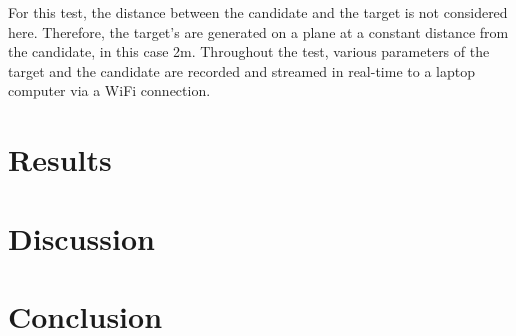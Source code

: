 \documentclass[format=sigconf, review=true, screen=true, anonymous=true]{acmart}
\begin{document}
For this test, the distance between the candidate and the target is not considered here. Therefore, the target's are generated on a plane at a constant distance from the candidate, in this case 2m. Throughout the test, various parameters of the target and the candidate are recorded and streamed in real-time to a laptop computer via a WiFi connection.

\section{Results}

\section{Discussion}

\section{Conclusion}



\end{document}
